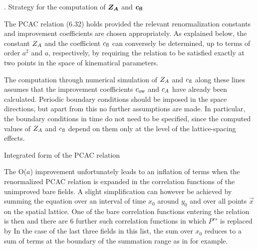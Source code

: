 

. Strategy for the computation of $\boldsymbol{Z_A}$ and ${\boldsymbol c}_{\bf fl}$

The PCAC relation (6.32) holds provided 
the relevant renormalization constants and improvement coefficients 
are chosen appropriately. 
As explained below,
the constant $Z_A$ and the 
coefficient $c_{\rm fl}$ can conversely be determined,
up to terms of order $a^2$ and $a$, respectively,
by requiring the relation to be satisfied exactly at
two points in the space of kinematical parameters.

The computation through numerical simulation 
of $Z_A$ and $c_{\rm fl}$ along these lines
assumes that the improvement coefficients 
$c_{\rm sw}$ and $c_A$ have already been calculated.
Periodic boundary conditions should be
imposed in the space directions, but apart from this no
further assumptions are made. In particular,
the boundary conditions in time do not need to be
specified, since the
computed values of $Z_A$ and $c_{\rm fl}$ 
depend on them only
at the level of the lattice-spacing effects.


 Integrated form of the PCAC relation

The O($a$) improvement unfortunately leads to an inflation
of terms when the renormalized PCAC relation is expanded
in the correlation functions of the unimproved bare fields.
A slight simplification can however be achieved by summing
the equation over an interval of time $x_0$ 
around $y_0$ and over
all points $\vec{x}$ on the spatial lattice. 
One of the bare correlation functions entering the 
relation is then
and there are $6$ further such correlation functions in which
$P^{rs}$ is replaced by
In the case of the last three fields in this list, 
the sum over $x_0$ reduces to 
a sum of terms at the boundary of the summation range as in 
for example.

